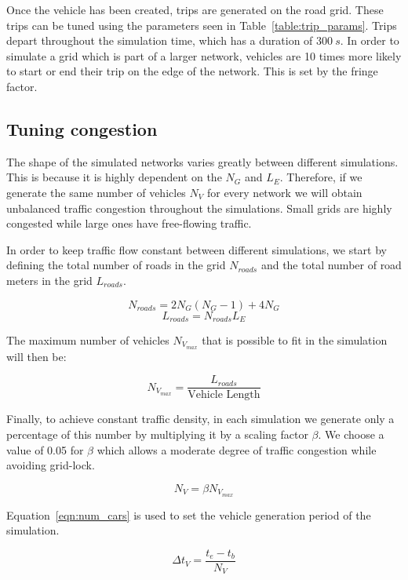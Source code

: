 Once the vehicle has been created, trips are generated on the road grid. These trips can be tuned using the parameters seen in Table~\ref{table:trip_params}. Trips depart throughout the simulation time, which has a duration of $300~s$. In order to simulate a grid which is part of a larger network, vehicles are 10 times more likely to start or end their trip on the edge of the network. This is set by the fringe factor. 

\subsection{Tuning congestion}
\label{sec:tuning_congestion}

The shape of the simulated networks varies greatly between different simulations. This is because it is highly dependent on the $N_G$ and $L_E$. Therefore, if we generate the same number of vehicles $N_V$ for every network we will obtain unbalanced traffic congestion throughout the simulations. Small grids are highly congested while large ones have free-flowing traffic. 

In order to keep traffic flow constant between different simulations, we start by defining the total number of roads in the grid $N_{roads}$ and the total number of road meters in the grid $L_{roads}$.

\begin{equation}
    N_{roads} = 2 N_G (N_G - 1) + 4 N_G
\end{equation} 
\begin{equation}
    L_{roads} = N_{roads} L_E
\end{equation}

The maximum number of vehicles $N_{V_{max}}$ that is possible to fit in the simulation will then be:

\begin{equation}
    N_{V_{max}} = \frac{L_{roads}}{\text{Vehicle Length}}
\end{equation}

Finally, to achieve constant traffic density, in each simulation we generate only a percentage of this number by multiplying it by a scaling factor $\beta$. We choose a value of 0.05 for $\beta$ which allows a moderate degree of traffic congestion while avoiding grid-lock.

\begin{equation}
    N_V = \beta  N_{V_{max}}
\end{equation}

Equation~\ref{eqn:num_cars} is used to set the vehicle generation period of the simulation.

\begin{equation}\label{eqn:num_cars}
   \Delta t_V  = \frac{t_e  - t_b}{N_V}
\end{equation}